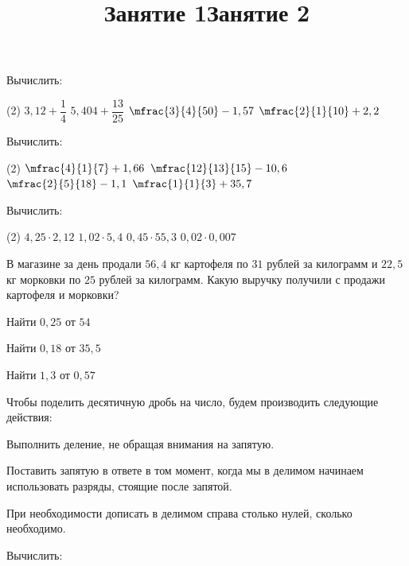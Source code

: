 %
%

\begin{class}[number=1-2]
	\title{Занятие 1}
	\begin{listofex}
		\item Вычислить:
		\begin{tasks}(2)
			\task \( 3,12+\dfrac{1}{4} \)
			\task \( 5,404+\dfrac{13}{25} \)
			\task \( \mfrac{3}{4}{50}-1,57\)
			\task \( \mfrac{2}{1}{10}+2,2 \)
		\end{tasks}
		\item Вычислить:
		\begin{tasks}(2)
			\task \( \mfrac{4}{1}{7}+1,66 \)
			\task \( \mfrac{12}{13}{15}-10,6 \)
			\task \( \mfrac{2}{5}{18}-1,1\)
			\task \( \mfrac{1}{1}{3}+35,7 \)
		\end{tasks}
		\item Вычислить:
		\begin{tasks}(2)
			\task \( 4,25\cdot2,12 \)
			\task \( 1,02\cdot5,4 \)
			\task \( 0,45\cdot55,3 \)
			\task \( 0,02\cdot0,007 \)
		\end{tasks}
		\item В магазине за день продали \( 56,4 \) кг картофеля по \( 31 \) рублей за килограмм и \( 22,5 \) кг морковки по \( 25 \) рублей за килограмм. Какую выручку получили с продажи картофеля и морковки?
		\item Найти \( 0,25 \) от \( 54 \)
		\item Найти \( 0,18 \) от \( 35,5 \)
		\item Найти \( 1,3 \) от \( 0,57 \)
	\end{listofex}
	\title{Занятие 2}
	\begin{definit}
		Чтобы поделить десятичную дробь на число, будем производить следующие действия:
		\begin{enumcols}[itemcolumns=1]
			\item Выполнить деление, не обращая внимания на запятую.
			\item Поставить запятую в ответе в том момент, когда мы в делимом
			начинаем использовать разряды, стоящие после запятой.
			\item При необходимости дописать в делимом справа столько нулей,
			сколько необходимо.
		\end{enumcols}
	\end{definit}
	\newpage
	\begin{listofex}
		\item Вычислить:

\end{listofex}
\end{class}
